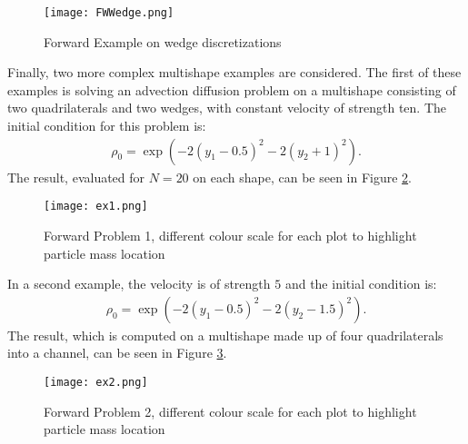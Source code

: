 \begin{figure}[h]
	\centering
	\texttt{[image: FWWedge.png]}
	\caption{Forward Example on wedge discretizations} 
	\label{FFW2}
\end{figure}



Finally, two more complex multishape examples are considered.
The first of these examples is solving an advection diffusion problem on a multishape consisting of two quadrilaterals and two wedges, with constant velocity of strength ten. The initial condition for this problem is:
 \begin{align*}
 	\rho_0 = \exp( -2(y_1 -0.5)^2 - 2 (y_2 + 1)^2).
 \end{align*}
The result, evaluated for $N= 20$ on each shape, can be seen in Figure \ref{F8}.

\begin{figure}[h]
	\centering
	\texttt{[image: ex1.png]}
	\caption{Forward Problem 1, different colour scale for each plot to highlight particle mass location}
	\label{F8}
\end{figure}

In a second example, the velocity is of strength $5$ and the initial condition is:
 \begin{align*}
	\rho_0 = \exp( -2(y_1 -0.5)^2 - 2 (y_2 - 1.5)^2).
\end{align*}
The result, which is computed on a multishape made up of four quadrilaterals into a channel, can be seen in Figure \ref{F9}.

\begin{figure}[h]
	\centering
	\texttt{[image: ex2.png]}
	\caption{Forward Problem 2, different colour scale for each plot to highlight particle mass location}
	\label{F9}
\end{figure}

